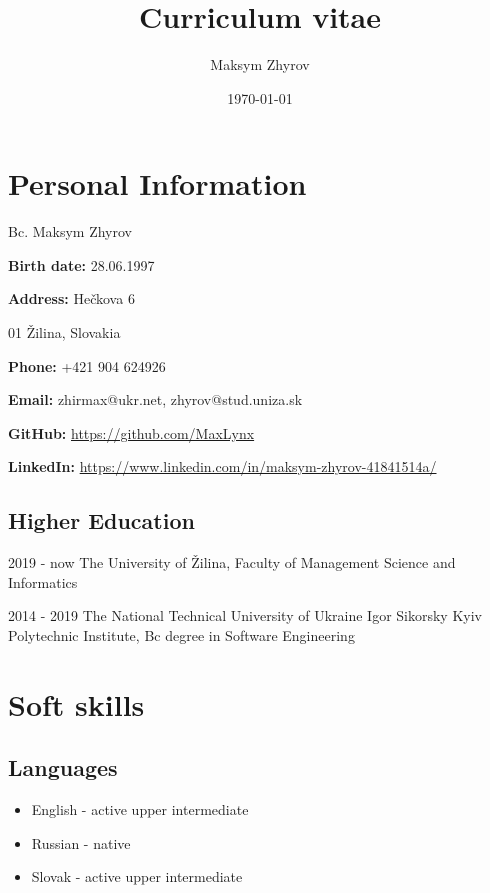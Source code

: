 \documentclass[a4paper,12pt]{article}
\author{Maksym Zhyrov}
\title{Curriculum vitae}
\date{\today}
\begin{document}
\section*{Personal Information}


{\Large Bc. Maksym Zhyrov}

\bigskip

\textbf{Birth date:} 28.06.1997

\smallskip

\textbf{Address:} 
Hečkova 6

\smallskip
\quad \quad \quad \quad {} 01 Žilina, 
Slovakia

\smallskip

\textbf{Phone:} +421 904 624926

\smallskip

\textbf{Email:} 
zhirmax@ukr.net, 
zhyrov@stud.uniza.sk 

\smallskip

\textbf{GitHub:} \url{https://github.com/MaxLynx}

\smallskip

\textbf{LinkedIn:} \url{https://www.linkedin.com/in/maksym-zhyrov-41841514a/}

\subsection*{Higher Education}

2019 - now The University of Žilina,
Faculty of Management Science and Informatics

2014 - 2019 The National Technical University of Ukraine 
Igor Sikorsky Kyiv Polytechnic Institute,
Bc degree in Software Engineering

\section*{Soft skills}

\subsection*{Languages}

\begin{itemize}
    \item English - active upper intermediate
    \item Russian - native
    \item Slovak - active upper intermediate
\end{itemize}
\end{document}
